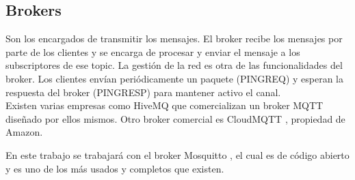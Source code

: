 \documentclass[12pt, twoside]{book}
\begin{document}
\subsection*{Brokers}
Son los encargados de transmitir los mensajes. El broker recibe los mensajes por parte de los clientes y se encarga de procesar y enviar el mensaje a los subscriptores de ese topic. La gestión de la red es otra de las funcionalidades del broker. Los clientes envían periódicamente un paquete (PINGREQ) y esperan la respuesta del broker (PINGRESP) para mantener activo el canal.\\
Existen varias empresas como HiveMQ \cite{hive}\cite{hive_doc} que comercializan un broker MQTT diseñado por ellos mismos. Otro broker comercial es CloudMQTT \cite{cloud_mqtt}, propiedad de Amazon.

En este trabajo se trabajará con el broker Mosquitto \cite{mosqtt}, el cual es de código abierto y es uno de los más usados y completos que existen.
\end{document}
